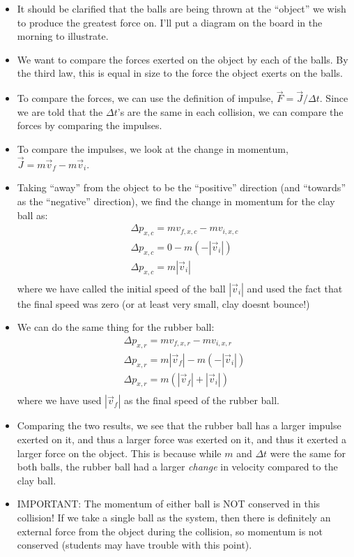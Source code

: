 \documentclass[fleqn,letterpaper]{article}
\begin{document}
\begin{itemize}
 \item{It should be clarified that the balls are being thrown at the ``object'' we wish to produce the greatest force on.  I'll put a diagram on the board in the morning to illustrate.}
 \item{We want to compare the forces exerted on the object by each of the balls.  By the third law, this is equal in size to the force the object exerts on the balls.}
 \item{To compare the forces, we can use the definition of impulse, $\vec{F} = \vec{J}/\Delta t$.  Since we are told that the $\Delta t$'s are the same in each collision, we can compare the forces by comparing the impulses. }
 \item{To compare the impulses, we look at the change in momentum, $\vec{J} = m\vec{v}_f - m\vec{v}_i$.}
 \item{Taking ``away'' from the object to be the ``positive'' direction (and ``towards'' as the ``negative'' direction), we find the change in momentum for the clay ball as:
  \begin{eqnarray*}
   \Delta p_{x,c} = m v_{f,x,c} - m v_{i,x,c} \\
   \Delta p_{x,c} = 0 - m (-|\vec{v}_i|) \\
   \Delta p_{x,c} =  m |\vec{v}_i| \\
  \end{eqnarray*}
  where we have called the initial speed of the ball $|\vec{v}_i|$ and used the fact that the final speed was zero (or at least very small, clay doesnt bounce!)}
 \item{We can do the same thing for the rubber ball:
 \begin{eqnarray*}
   \Delta p_{x,r} = m v_{f,x,r} - m v_{i,x,r} \\
   \Delta p_{x,r} = m |\vec{v}_f| - m (-|\vec{v}_i|) \\
   \Delta p_{x,r} =  m( |\vec{v}_f| + |\vec{v}_i|) \\
  \end{eqnarray*}
 where we have used $|\vec{v}_f|$ as the final speed of the rubber ball.}
 \item{Comparing the two results, we see that the rubber ball has a larger impulse exerted on it, and thus a larger force was exerted on it, and thus it exerted a larger force on the object.  This is because while $m$ and $\Delta t$ were the same for both balls, the rubber ball had a larger \textit{change} in velocity compared to the clay ball.}
 \item{IMPORTANT:  The momentum of either ball is NOT conserved in this collision!  If we take a single ball as the system, then there is definitely an external force from the object during the collision, so momentum is not conserved (students may have trouble with this point).}
\end{itemize}
 
\end{document}
